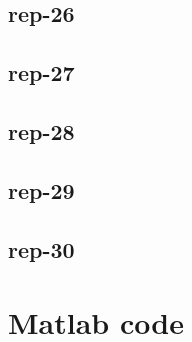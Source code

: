 \documentclass{article}
\begin{document}
\subsection{rep-26}
\subsection{rep-27}
\subsection{rep-28}
\subsection{rep-29}
\subsection{rep-30}

\appendix
\section{Matlab code}


\end{document}
